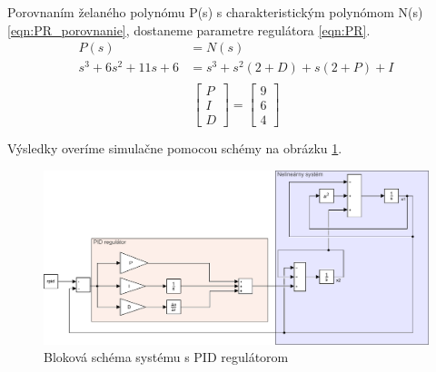 \documentclass[../main.tex]{subfiles}
\begin{document}
Porovnaním želaného polynómu P(s) s charakteristickým polynómom N(s) \ref{eqn:PR_porovnanie}, dostaneme parametre regulátora \ref{eqn:PR}.
\begin{equation}
	\begin{aligned}
	P(s) &= N(s) \\
	s^3 + 6s^2 + 11s + 6 &= s^3+s^2(2+D)+s(2+P)+I\\
	\end{aligned}
 \label{eqn:PR_porovnanie}
\end{equation}	
 \begin{equation}
\begin{bmatrix}P \\I\\ D \end{bmatrix} = \begin{bmatrix} 9 \\6\\4 \end{bmatrix}
 \label{eqn:PR}
\end{equation}

Výsledky overíme simulačne pomocou schémy na obrázku \ref{fig:PrikladsRiadenimPID}.
\begin{figure}[H]
	\begin{center}\includegraphics[scale=0.6]{pid.pdf}\end{center}
	\caption{Bloková schéma systému s PID regulátorom}
	\label{fig:PrikladsRiadenimPID}
\end{figure}
\end{document}
